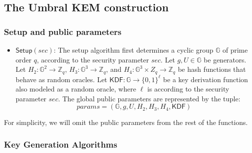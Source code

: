 \documentclass{amsart}
\begin{document}
\subsection{The Umbral KEM construction}

\subsubsection{Setup and public parameters}\label{sec:setup_umbral}

\begin{itemize}

\item $\mathsf{Setup}(sec)$: The setup algorithm first determines a cyclic group $\mathbb G$ of prime order $q$, according to the security parameter $sec$. Let $g, U\in \mathbb G$ be generators. Let $H_2: \mathbb G^2 \to \mathbb Z_q$, $H_3: \mathbb G^3 \to \mathbb Z_q$, and $H_4: \mathbb G^3 \times Z_q \to \mathbb Z_q$ be hash functions that behave as random oracles. Let $\mathsf{KDF}: \mathbb G \to \{0,1\}^\ell$ be a key derivation function also modeled as a random oracle, where $\ell$ is according to the security parameter $sec$. The global public parameters are represented by the tuple:
$$params = (\mathbb G, g, U, H_2, H_3, H_4, \mathsf{KDF})$$

\end{itemize}

For simplicity, we will omit the public parameters from the rest of the functions. 

\subsubsection{Key Generation Algorithms}
\end{document}
